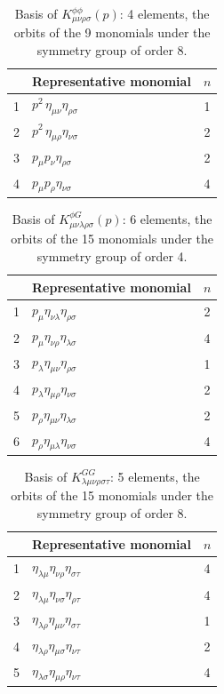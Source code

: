 \documentclass[prd,aps,preprint,superscriptaddress,nofootinbib,amsmath,amssymb,eqsecnum]{revtex4-2}
\begin{document}
\begin{table}[htb]
\centering
\begin{tabular}{@{}cl c@{}}
\toprule
& Representative monomial & $n$ \\
\midrule
1 & $p^2\,\eta_{\mu\nu}\eta_{\rho\sigma}$ & 1 \\
2 & $p^2\,\eta_{\mu\rho}\eta_{\nu\sigma}$ & 2 \\
3 & $p_{\mu}p_{\nu}\eta_{\rho\sigma}$ & 2 \\
4 & $p_{\mu}p_{\rho}\eta_{\nu\sigma}$ & 4 \\
\bottomrule
\end{tabular}
\caption{Basis of $K^{\phi\phi}_{\mu\nu\rho\sigma}(p)$: 4 elements, the orbits of the 9 monomials
under the symmetry group of order 8.}
\label{tab:basis-phiphi}
\end{table}

\begin{table}[htb]
\centering
\begin{tabular}{@{}cl c@{}}
\toprule
& Representative monomial & $n$ \\
\midrule
1 & $p_{\mu}\eta_{\nu\lambda}\eta_{\rho\sigma}$ & 2 \\
2 & $p_{\mu}\eta_{\nu\rho}\eta_{\lambda\sigma}$ & 4 \\
3 & $p_{\lambda}\eta_{\mu\nu}\eta_{\rho\sigma}$ & 1 \\
4 & $p_{\lambda}\eta_{\mu\rho}\eta_{\nu\sigma}$ & 2 \\
5 & $p_{\rho}\eta_{\mu\nu}\eta_{\lambda\sigma}$ & 2 \\
6 & $p_{\rho}\eta_{\mu\lambda}\eta_{\nu\sigma}$ & 4 \\
\bottomrule
\end{tabular}
\caption{Basis of $K^{\phi G}_{\mu\nu\lambda\rho\sigma}(p)$: 6 elements, the orbits of the 15
monomials under the symmetry group of order 4.}
\label{tab:basis-phiG}
\end{table}

\begin{table}[htb]
\centering
\begin{tabular}{@{}cl c@{}}
\toprule
& Representative monomial & $n$ \\
\midrule
1 & $\eta_{\lambda\mu}\eta_{\nu\rho}\eta_{\sigma\tau}$ & 4 \\
2 & $\eta_{\lambda\mu}\eta_{\nu\sigma}\eta_{\rho\tau}$ & 4 \\
3 & $\eta_{\lambda\rho}\eta_{\mu\nu}\eta_{\sigma\tau}$ & 1 \\
4 & $\eta_{\lambda\rho}\eta_{\mu\sigma}\eta_{\nu\tau}$ & 2 \\
5 & $\eta_{\lambda\sigma}\eta_{\mu\rho}\eta_{\nu\tau}$ & 4 \\
\bottomrule
\end{tabular}
\caption{Basis of $K^{GG}_{\lambda\mu\nu\rho\sigma\tau}$: 5 elements, the orbits of the 15
monomials under the symmetry group of order 8.}
\label{tab:basis-GG}
\end{table}
\end{document}

